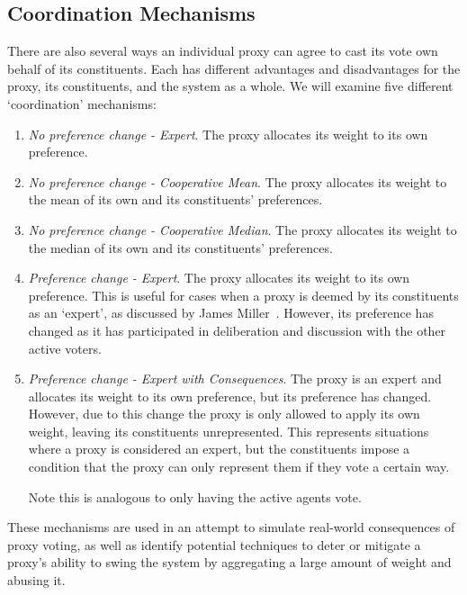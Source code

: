 \subsection{Coordination Mechanisms}\label{subsec:coordination-mechanisms}
There are also several ways an individual proxy can agree to cast its vote own behalf
of its constituents.
Each has different advantages and disadvantages for the proxy, its constituents, and
the system as a whole.
We will examine five different `coordination' mechanisms:
\begin{enumerate}
    \item {
        \textit{No preference change - Expert}.
        The proxy allocates its weight to its own preference.
    }
    \item {
        \textit{No preference change - Cooperative Mean}.
        The proxy allocates its weight to the mean of its own and its constituents'
        preferences.
    }
    \item {
        \textit{No preference change - Cooperative Median}.
        The proxy allocates its weight to the median of its own and its constituents'
        preferences.
    }
    \item {
        \textit{Preference change - Expert}.
        The proxy allocates its weight to its own preference.
        This is useful for cases when a proxy is deemed by its constituents as an
        `expert', as discussed by James Miller~\cite{Miller1969}.
        However, its preference has changed as it has participated in deliberation
        and discussion with the other active voters.
    }
    \item {
        \textit{Preference change - Expert with Consequences}.
        The proxy is an expert and allocates its weight to its own preference, but its
        preference has changed.
        However, due to this change the proxy is only allowed to apply its own
        weight, leaving its constituents unrepresented.
        This represents situations where a proxy is considered an expert, but the
        constituents impose a condition that the proxy can only represent them if
        they vote a certain way.

        Note this is analogous to only having the active agents vote.
    }
\end{enumerate}
These mechanisms are used in an attempt to simulate real-world consequences of proxy
voting, as well as identify potential techniques to deter or mitigate a proxy's
ability to swing the system by aggregating a large amount of weight and abusing it.
